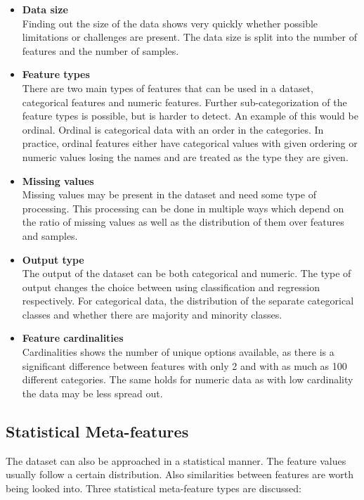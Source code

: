 \documentclass[10pt,a4paper]{article}
\begin{document}
	\begin{itemize}
		\item \textbf{Data size} \\
		Finding out the size of the data shows very quickly whether possible limitations or challenges are present. The data size is split into the number of features and the number of samples.
		\item \textbf{Feature types} \\
		There are two main types of features that can be used in a dataset, categorical features and numeric features. Further sub-categorization of the feature types is possible, but is harder to detect. An example of this would be ordinal. Ordinal is categorical data with an order in the categories. In practice, ordinal features either have categorical values with given ordering or numeric values losing the names and are treated as the type they are given.
		\item \textbf{Missing values} \\
		Missing values may be present in the dataset and need some type of processing. This processing can be done in multiple ways which depend on the ratio of missing values as well as the distribution of them over features and samples.
		\item \textbf{Output type} \\
		The output of the dataset can be both categorical and numeric. The type of output changes the choice between using classification and regression respectively. For categorical data, the distribution of the separate categorical classes and whether there are majority and minority classes.
		\item \textbf{Feature cardinalities} \\
		Cardinalities shows the number of unique options available, as there is a significant difference between features with only 2 and with as much as 100 different categories. The same holds for numeric data as with low cardinality the data may be less spread out.
	\end{itemize}
	
	\subsection{Statistical Meta-features}
	\label{subsec:StatisticalMF}
	
	The dataset can also be approached in a statistical manner. The feature values usually follow a certain distribution. Also similarities between features are worth being looked into. Three statistical meta-feature types are discussed:
	
\end{document}
